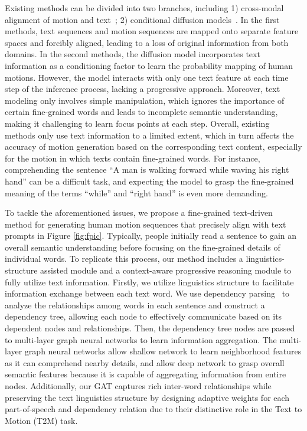 \documentclass[10pt,twocolumn,letterpaper]{article}
\begin{document}
Existing methods can be divided into two branches, including 1) cross-modal alignment of motion and text~\cite{ahuja2019language2pose,bhattacharya2021text2gestures,ghosh2021synthesis,guo2022generating,guo2022tm2t,lin:vigil18,petrovich2022temos}; 2) conditional diffusion models~\cite{tevet2022human,zhang2022motiondiffuse}. 
In the first methods, text sequences and motion sequences are mapped onto separate feature spaces and forcibly aligned, leading to a loss of original information from both domains. In the second methods, the diffusion model incorporates text information as a conditioning factor to learn the probability mapping of human motions. However, the model interacts with only one text feature at each time step of the inference process, lacking a progressive approach. Moreover, text modeling only involves simple manipulation, which ignores the importance of certain fine-grained words and leads to incomplete semantic understanding, making it challenging to learn focus points at each step. Overall, existing methods only use text information to a limited extent, which in turn affects the accuracy of motion generation based on the corresponding text content, especially for the motion in which texts contain fine-grained words. 
For instance, comprehending the sentence ``A man is walking forward while waving his right hand'' can be a difficult task, and expecting the model to grasp the fine-grained meaning of the terms ``while'' and ``right hand'' is even more demanding.




To tackle the aforementioned issues, we propose a fine-grained text-driven method for generating human motion sequences that precisely align with text prompts in Figure \ref{fig:fpic}.
Typically, people initially read a sentence to gain an overall semantic understanding before focusing on the fine-grained details of individual words. To replicate this process,  our method includes a linguistics-structure assisted module and a context-aware progressive reasoning module to fully utilize text information. Firstly, we utilize linguistics structure to facilitate information exchange between each text word. We use dependency parsing~\cite{nivre2008algorithms} to analyze the relationships among words in each sentence and construct a dependency tree, allowing each node to effectively communicate based on its dependent nodes and relationships. Then, the dependency tree nodes are passed to multi-layer graph neural networks to learn information aggregation. The multi-layer graph neural networks allow shallow network to learn neighborhood features as it can comprehend nearby details, and allow deep network to grasp overall semantic features because it is capable of aggregating information from entire nodes. Additionally, our GAT captures rich inter-word relationships while preserving the text linguistics structure by designing adaptive weights for each part-of-speech and dependency relation due to their distinctive role in the Text to Motion (T2M) task. 
\end{document}
